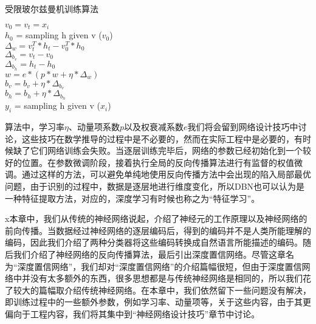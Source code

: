 \vspace{1em}
\begin{minipage}{0.8\textwidth}\centering
\begin{algorithm}[H]\label{alg:RBM}
 \caption{受限玻尔兹曼机训练算法}
{
$v_0 = v_t = x_i$\\
$h_0$ = sampling h given v ($v_0$)\\
$\Delta_w = v_t^T * h_t - v_0^T * h_0$\\
$\Delta_{b_v} = v_t - v_0$\\
$\Delta_{b_h} = h_t - h_0$\\
$w = e * (p*w + \eta * \Delta_w)$\\
$b_v = b_v + \eta * \Delta_{b_v}$\\
$b_h = b_h + \eta * \Delta_{b_h}$\\
$y_i$ = sampling h given v ($x_i$)
}
\end{algorithm}
\end{minipage}
\vspace{1em}

算法中，学习率$\eta$、动量项系数$p$以及权衰减系数$e$我们将会留到网络设计技巧中讨论，这些技巧在数学推导的过程中是不必要的，然而在实际工程中是必要的，有时候缺了它们网络训练会失败。当逐层训练完毕后，网络的参数已经初始化到一个较好的位置。在参数微调阶段，接着执行全局的反向传播算法进行有监督的权值微调。通过这样的方法，可以避免单纯地使用反向传播方法中会出现的陷入局部最优问题，由于识别的过程中，数据是逐层地进行维度变化，所以DBN也可以认为是一种特征提取方法，对应的，深度学习有时候也称之为“特征学习”。

x本章中，我们从传统的神经网络说起，介绍了神经元的工作原理以及神经网络的前向传播。当数据经过神经网络的逐层编码后，得到的编码并不是人类所能理解的编码，因此我们介绍了两种分类器将这些编码转换成自然语言所能描述的编码。随后我们介绍了神经网络的反向传播算法，最后引出深度置信网络。尽管这章名为“深度置信网络”，我们却对“深度置信网络”的介绍篇幅很短，但由于深度置信网络中并没有太多额外的东西，很多思想都是与传统神经网络是相同的，所以我们花了较大的篇幅取介绍传统神经网络。在本章中，我们依然留下一些问题没有解决，即训练过程中的一些额外参数，例如学习率、动量项等，关于这些内容，由于其更偏向于工程内容，我们将其集中到“神经网络设计技巧”章节中讨论。



